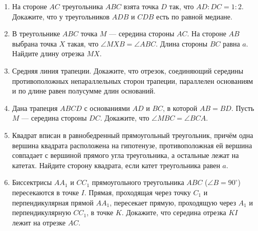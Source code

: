 \documentclass{article}
\begin{document}
\begin{enumerate}[label*=\protect\fbox{\arabic{enumi}}]
\item На стороне $AC$ треугольника $ABC$ взята точка $D$ так, что $AD:DC=1:2$. Докажите, что у треугольников $ADB$ и $CDB$ есть по равной медиане.

\item В треугольнике $ABC$ точка $M$ — середина стороны $AC$. На стороне $AB$ выбрана точка $X$ такая, что $\angle MXB=\angle ABC$. Длина стороны $BC$ равна $a$. Найдите длину отрезка $MX$.

\item Средняя линия трапеции. Докажите, что отрезок, соединяющий середины противоположных непараллельных сторон трапеции, параллелен основаниям и по длине равен полусумме длин оснований.

\item Дана трапеция $ABCD$ с основаниями $AD$ и $BC$, в которой $AB=BD$. Пусть $M$ — середина стороны $DC$. Докажите, что $\angle MBC=\angle BCA$.

\item Квадрат вписан в равнобедренный прямоугольный треугольник, причём одна вершина квадрата расположена на гипотенузе, противоположная ей вершина совпадает с вершиной прямого угла треугольника, а остальные лежат на катетах. Найдите сторону квадрата, если катет треугольника равен $a$.

\item Биссектрисы $AA_1$ и $CC_1$ прямоугольного треугольника $ABC$ ($\angle B=90^\circ$) пересекаются в точке $I$. Прямая, проходящая через точку $C_1$ и перпендикулярная прямой $AA_1$, пересекает прямую, проходящую через $A_1$ и перпендикулярную $CC_1$, в точке $K$. Докажите, что середина отрезка $KI$ лежит на отрезке $AC$.


\end{enumerate}
\end{document}
